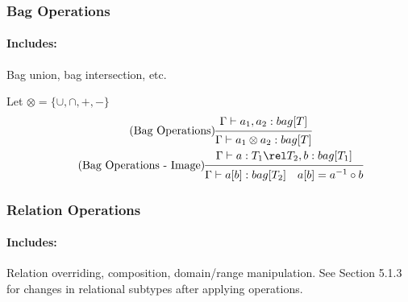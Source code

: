 \documentclass{article}
\newcommand{\ruleSpace}{\ \ \ }
\begin{document}
\subsubsection{Bag Operations}
\paragraph{Includes:} Bag union, bag intersection, etc.

Let $\otimes = \{\cup, \cap, +, -\}$
\begin{gather}
\tag{Bag Operations}
\begin{prooftree}
\hypo{\Gamma \vdash a_1, a_2: bag[T]}
\infer1{\Gamma \vdash a_1 \otimes a_2: bag[T]}
\end{prooftree}
\\
\tag{Bag Operations - Image}
\begin{prooftree}
\hypo{\Gamma \vdash a: T_1 \rel T_2, b: bag[T_1]}
\infer1{\Gamma \vdash a[b]: bag[T_2] \ruleSpace a[b] = a^{-1} \circ b}
\end{prooftree}
\end{gather}

\subsubsection{Relation Operations}
\paragraph{Includes:} Relation overriding, composition, domain/range manipulation. See Section 5.1.3 for changes in relational subtypes after applying operations.
\end{document}
